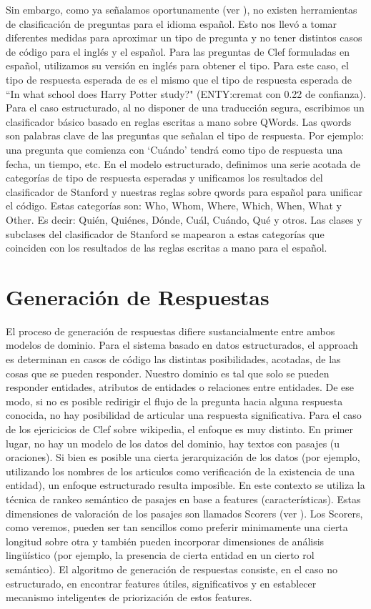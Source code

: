 Sin embargo, como ya señalamos oportunamente (ver ), no existen herramientas de clasificación de preguntas para el idioma español. Esto nos llevó a tomar diferentes medidas para aproximar un tipo de pregunta y no tener distintos casos de código para el inglés y el español. Para las preguntas de Clef formuladas en español, utilizamos su versión en inglés para obtener el tipo.
Para este caso, el tipo de respuesta esperada de  es el mismo que el tipo de respuesta esperada de ``In what school does Harry Potter study?" (ENTY:cremat con 0.22 de confianza). Para el caso estructurado, al no disponer de una traducción segura, escribimos un clasificador básico basado en reglas escritas a mano sobre QWords. Las qwords son palabras clave de las preguntas que señalan el tipo de respuesta. Por ejemplo: una pregunta que comienza con `Cuándo' tendrá como tipo de respuesta una fecha, un tiempo, etc. En el modelo estructurado, definimos una serie acotada de categorías de tipo de respuesta esperadas y unificamos los resultados del clasificador de Stanford y nuestras reglas sobre qwords para español para unificar el código. Estas categorías son:  Who, Whom, Where, Which,  When,  What y Other. Es decir: Quién, Quiénes, Dónde, Cuál, Cuándo, Qué y otros. Las clases y subclases del clasificador de Stanford se mapearon a estas categorías que coinciden con los resultados de las reglas escritas a mano para el español. 



\section{Generación de Respuestas}

El proceso de generación de respuestas difiere sustancialmente entre ambos modelos de dominio. Para el sistema basado en datos estructurados, el approach es determinan en casos de código las distintas posibilidades, acotadas, de las cosas que se pueden responder. Nuestro dominio es tal que solo se pueden responder entidades, atributos de entidades o relaciones entre entidades. De ese modo, si no es posible redirigir el flujo de la pregunta hacia alguna respuesta conocida, no hay posibilidad de articular una respuesta significativa. Para el caso de los ejericicios de Clef sobre wikipedia, el enfoque es muy distinto. En primer lugar, no hay un modelo de los datos del dominio, hay textos con pasajes (u oraciones). Si bien es posible una cierta jerarquización de los datos (por ejemplo, utilizando los nombres de los articulos como verificación de la existencia de una entidad), un enfoque estructurado resulta imposible. En este contexto se utiliza la técnica de rankeo semántico de pasajes en base a features (características). Estas dimensiones de valoración de los pasajes son llamados Scorers (ver ). Los Scorers, como veremos, pueden ser tan sencillos como preferir minimamente una cierta longitud sobre otra y también pueden incorporar dimensiones de análisis lingüístico (por ejemplo, la presencia de cierta entidad en un cierto rol semántico). El algoritmo de generación de respuestas consiste, en el caso no estructurado, en encontrar features útiles, significativos y en establecer mecanismo inteligentes de priorización de estos features. 
